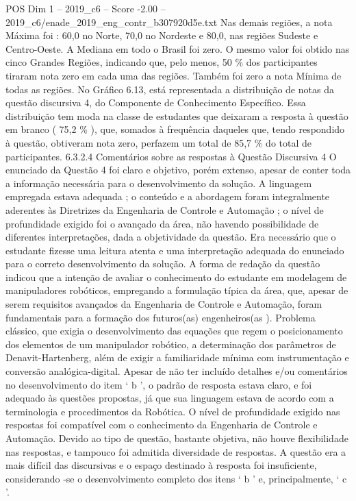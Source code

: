 \begin{textsample}{POS Dim 1 – 2019\_c6 – Score -2.00 – 2019\_c6/enade\_2019\_eng\_contr\_b307920d5e.txt}
Nas demais regiões, a nota Máxima foi : 60,0 no Norte, 70,0 no Nordeste e 80,0, nas regiões Sudeste e Centro-Oeste.
A Mediana em todo o Brasil foi zero.
O mesmo valor foi obtido nas cinco Grandes Regiões, indicando que, pelo menos, 50 \% dos participantes tiraram nota zero em cada uma das regiões.
Também foi zero a nota Mínima de todas as regiões.
No Gráfico 6.13, está representada a distribuição de notas da questão discursiva 4, do Componente de Conhecimento Específico.
Essa distribuição tem moda na classe de estudantes que deixaram a resposta à questão em branco ( 75,2 \% ), que, somados à frequência daqueles que, tendo respondido à questão, obtiveram nota zero, perfazem um total de 85,7 \% do total de participantes. 6.3.2.4 Comentários sobre as respostas à Questão Discursiva 4 O enunciado da Questão 4 foi claro e objetivo, porém extenso, apesar de conter toda a informação necessária para o desenvolvimento da solução.
A linguagem empregada estava adequada ; o conteúdo e a abordagem foram integralmente aderentes às Diretrizes da Engenharia de Controle e Automação ; o nível de profundidade exigido foi o avançado da área, não havendo possibilidade de diferentes interpretações, dada a objetividade da questão.
Era necessário que o estudante fizesse uma leitura atenta e uma interpretação adequada do enunciado para o correto desenvolvimento da solução.
A forma de redação da questão indicou que a intenção de avaliar o conhecimento do estudante em modelagem de manipuladores robóticos, empregando a formulação típica da área, que, apesar de serem requisitos avançados da Engenharia de Controle e Automação, foram fundamentais para a formação dos futuros(as) engenheiros(as ).
Problema clássico, que exigia o desenvolvimento das equações que regem o posicionamento dos elementos de um manipulador robótico, a determinação dos parâmetros de Denavit-Hartenberg, além de exigir a familiaridade mínima com instrumentação e conversão analógica-digital.
Apesar de não ter incluído detalhes e/ou comentários no desenvolvimento do item ‘ b ’, o padrão de resposta estava claro, e foi adequado às questões propostas, já que sua linguagem estava de acordo com a terminologia e procedimentos da Robótica.
O nível de profundidade exigido nas respostas foi compatível com o conhecimento da Engenharia de Controle e Automação.
Devido ao tipo de questão, bastante objetiva, não houve flexibilidade nas respostas, e tampouco foi admitida diversidade de respostas.
A questão era a mais difícil das discursivas e o espaço destinado à resposta foi insuficiente, considerando -se o desenvolvimento completo dos itens ‘ b ’ e, principalmente, ‘ c ’.

\end{textsample}

